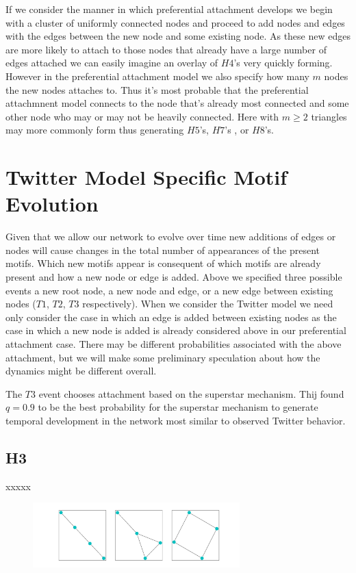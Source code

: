 If we consider the manner in which preferential attachment develops we begin with a cluster of uniformly
connected nodes and proceed to add nodes and edges with the edges between the new node and some existing node.
As these new edges are more likely to attach to those nodes that already have a large number
of edges attached we can easily imagine an overlay of $H4$'s very quickly forming. However in the 
preferential attachment model we also specify how many $m$ nodes the new nodes attaches to. Thus it's most probable
that the preferential attachmnent model connects to the node that's already most connected 
and some other node who may or may not be heavily connected. Here with $m \geq 2$ triangles may more 
commonly form thus generating $H5$'s, $H7$'s , or $H8$'s.

\chapter{Twitter Model Specific Motif Evolution}

Given that we allow our network to evolve over time new additions of edges or nodes will cause changes
in the total number of appearances of the present motifs. Which new motifs appear is consequent of
which motifs are already present and how a new node or edge is added. Above we specified three possible
events a new root node, a new node and edge, or a new edge between existing nodes 
($T1$, $T2$, $T3$ respectively). When we consider the Twitter model we need only consider the 
case in which an edge is added between existing nodes as the case in which a new node is added is already
considered above in our preferential attachment case. There may be different probabilities associated with the 
above attachment, but we will make some preliminary speculation about how the dynamics might be different overall.

The $T3$ event chooses attachment based on the superstar mechanism. Thij found $q=0.9$ to be the best 
probability for the superstar mechanism to generate temporal development in the network
most similar to observed Twitter behavior. \cite{thij} 

\section{H3}
xxxxx
\begin{figure}[!ht]
    \includegraphics[width=8cm]{Images/H3_T3_evolution.png}
    \centering
\end{figure}

